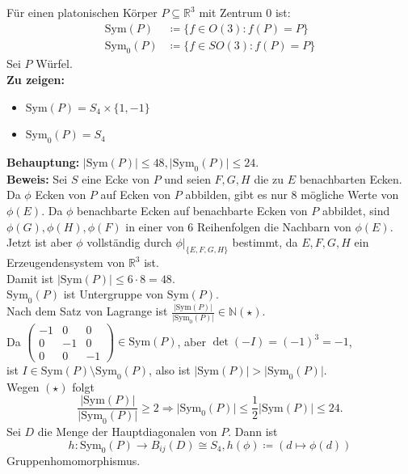\begin{problem}[3]
  
  Für einen platonischen Körper \( P \subseteq \mathbb{R}^3 \) mit Zentrum \( 0 \) ist:
  \begin{align*}
    \text{Sym}(P) &\coloneqq \{ f \in O(3): f(P) = P \} \\
    \text{Sym}_0(P) &\coloneqq \{ f \in SO(3): f(P) = P \}
  \end{align*} 
  Sei \( P \) Würfel. \\
  \textbf{Zu zeigen:} 
  \begin{itemize}
    \item \( \text{Sym}(P) = S_4 \times \{ 1, -1 \} \)
    \item \( \text{Sym}_0(P) = S_4 \)
  \end{itemize}
  \textbf{Behauptung:} 
  \( \vert \text{Sym}(P) \vert \leq 48, \vert \text{Sym}_0(P) \vert \leq 24 \). \\
  \textbf{Beweis:} Sei \( S \) eine Ecke von \( P \) und seien \( F,G,H \) die zu \( E \) benachbarten Ecken. Da \( \phi \) Ecken von \( P \) auf Ecken von \( P \) abbilden, gibt es nur 8 mögliche Werte von \( \phi(E) \). Da \( \phi \) benachbarte Ecken auf benachbarte Ecken von \( P \) abbildet, sind \( \phi(G), \phi(H), \phi(F) \) in einer von 6 Reihenfolgen die Nachbarn von \( \phi(E) \). Jetzt ist aber \( \phi \) vollständig durch \( \phi|_{\{ E,F,G,H \}} \) bestimmt, da \( E,F,G,H \) ein Erzeugendensystem von \( \mathbb{R}^3 \) ist. \\
  Damit ist \( \vert \text{Sym}(P) \vert \leq 6 \cdot 8 = 48 \). \\
  \( \text{Sym}_0(P) \) ist Untergruppe von \( \text{Sym}(P) \). \\
  Nach dem Satz von Lagrange ist \( \frac{\vert \text{Sym}(P) \vert}{\vert \text{Sym}_0(P) \vert} \in \mathbb{N} (\star) \). \\
  Da \( \begin{pmatrix}
    -1 & 0 & 0 \\
    0 & -1 & 0 \\
    0 & 0 & -1 
  \end{pmatrix} \in \text{Sym}(P) \), aber \( \det(-I) = {(-1)}^3 = -1 \),\\
  ist \( I \in \text{Sym}(P) \setminus \text{Sym}_0(P) \), also ist \( \vert \text{Sym}(P) \vert > \vert \text{Sym}_0(P) \vert \). \\
  Wegen \( (\star) \) folgt
  \begin{equation*}
    \frac{\vert \text{Sym}(P) \vert}{\vert \text{Sym}_0(P) \vert} \geq 2 \Rightarrow \vert \text{Sym}_0(P) \vert \leq \frac{1}{2} \vert \text{Sym}(P) \vert \leq 24.
  \end{equation*}
  Sei \( D \) die Menge der Hauptdiagonalen von \( P \). Dann ist 
  \begin{equation*}
    h: \text{Sym}_0(P) \to B_{ij}(D) \cong S_4, h(\phi) \coloneqq (d \mapsto \phi(d))
  \end{equation*}
  Gruppenhomomorphismus. \\


\end{problem}
